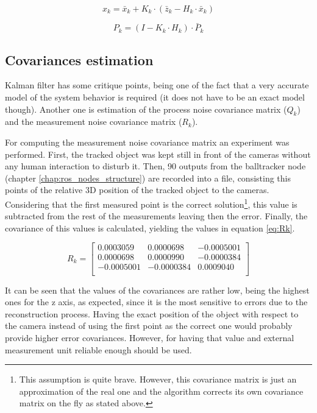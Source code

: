 \begin{equation}
x_{k}=\bar{x}_{k}+K_{k} \cdot (\bar{z}_{k}-H_{k} \cdot \bar{x}_{k})
\label{eq:final_state}
\end{equation}

\begin{equation}
P_{k}=(I-K_{k} \cdot H_{k}) \cdot \bar{P}_{k}
\label{eq:error_covariance}
\end{equation}

\subsection{Covariances estimation}
Kalman filter has some critique points, being one of the fact that a very accurate model of the system behavior is required (it does not have to be an exact model though).
Another one is estimation of the process noise covariance matrix ($Q_{k}$) and the measurement noise covariance matrix ($R_{k}$).

For computing the measurement noise covariance matrix an experiment was performed. First, the tracked object was kept still in front of the cameras without any human interaction to disturb it.
Then, 90 outputs from the balltracker node (chapter \ref{chap:ros_nodes_structure}) are recorded into a file, consisting this points of the relative 3D position of the tracked object to the cameras.
Considering that the first measured point is the correct solution\footnote{This assumption is quite brave.
However, this covariance matrix is just an approximation of the real one and the algorithm corrects its own covariance matrix on the fly as stated above.}, this value is subtracted from the rest of the measurements leaving then the error.
Finally, the covariance of this values is calculated, yielding the values in equation \eqref{eq:Rk}.

\begin{equation}
R_{k}=
\begin{bmatrix}
0.0003059 & 0.0000698 & -0.0005001 \\
0.0000698 & 0.0000990 & -0.0000384 \\
-0.0005001 & -0.0000384 & 0.0009040 \\
\end{bmatrix}
\label{eq:Rk}
\end{equation}

It can be seen that the values of the covariances are rather low, being the highest ones for the z axis, as expected, since it is the most sensitive to errors due to the reconstruction process.
Having the exact position of the object with respect to the camera instead of using the first point as the correct one would probably provide higher error covariances.
However, for having that value and external measurement unit reliable enough should be used.

